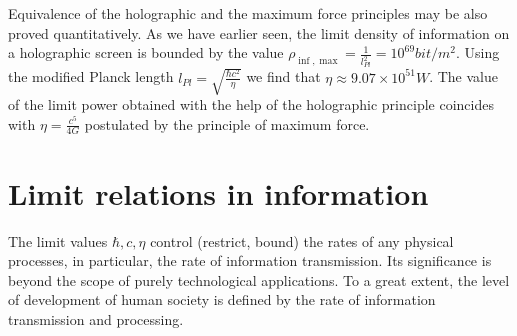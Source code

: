 \documentclass [12pt]{article}
\begin{document}
Equivalence of the holographic and the maximum force principles may be also proved quantitatively. As we have earlier seen, the limit density of information on a holographic screen  is bounded by the value  ${\rho _{\inf ,\max }} = \frac{1}{{l_{Pl}^2}} = {10^{69}}bit/{m^2}$. Using the modified Planck length ${l_{Pl}} = \sqrt {\frac{{\hbar {c^2}}}{\eta }} $ we find that $\eta  \approx 9.07 \times {10^{51}}W$. The value of the limit power obtained with the help of the holographic principle  coincides with $\eta  = \frac{{{c^5}}}{{4G}}$ postulated by the principle of maximum force.

\section{Limit relations in information}

The limit values $\hbar ,c,\eta $ control (restrict, bound) the rates of any physical processes, in particular, the rate of information transmission. Its significance is beyond the scope of purely technological applications. To a great extent, the level of development of human society is defined by the rate of information transmission and processing.
\end{document}
